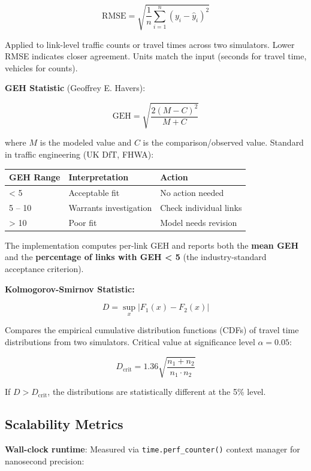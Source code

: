 \[\text{RMSE} = \sqrt{\frac{1}{n}\sum_{i=1}^{n}(y_i - \hat{y}_i)^2}\]

Applied to link-level traffic counts or travel times across two
simulators. Lower RMSE indicates closer agreement. Units match the input
(seconds for travel time, vehicles for counts).

\textbf{GEH Statistic} (Geoffrey E. Havers):

\[\text{GEH} = \sqrt{\frac{2(M - C)^2}{M + C}}\]

where \(M\) is the modeled value and \(C\) is the comparison/observed
value. Standard in traffic engineering (UK DfT, FHWA):

\begin{longtable}[]{@{}lll@{}}
\toprule\noalign{}
GEH Range & Interpretation & Action \\
\midrule\noalign{}
\endhead
\bottomrule\noalign{}
\endlastfoot
\textless{} 5 & Acceptable fit & No action needed \\
5 -- 10 & Warrants investigation & Check individual links \\
\textgreater{} 10 & Poor fit & Model needs revision \\
\end{longtable}

The implementation computes per-link GEH and reports both the
\textbf{mean GEH} and the \textbf{percentage of links with GEH
\textless{} 5} (the industry-standard acceptance criterion).

\textbf{Kolmogorov-Smirnov Statistic:}

\[D = \sup_x |F_1(x) - F_2(x)|\]

Compares the empirical cumulative distribution functions (CDFs) of
travel time distributions from two simulators. Critical value at
significance level \(\alpha = 0.05\):

\[D_{\text{crit}} = 1.36 \sqrt{\frac{n_1 + n_2}{n_1 \cdot n_2}}\]

If \(D > D_{\text{crit}}\), the distributions are statistically
different at the 5\% level.

\subsection{Scalability Metrics}\label{363-scalability-metrics}

\textbf{Wall-clock runtime}: Measured via \texttt{time.perf\_counter()}
context manager for nanosecond precision:

